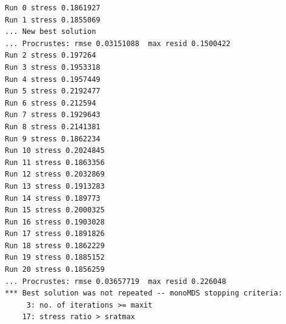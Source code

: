 \documentclass[
  letterpaper,
  DIV=11,
  numbers=noendperiod]{scrartcl}
\newenvironment{Shaded}{\begin{snugshade}}{\end{snugshade}}
\newcommand{\AttributeTok}[1]{\textcolor[rgb]{0.40,0.45,0.13}{#1}}
\newcommand{\ConstantTok}[1]{\textcolor[rgb]{0.56,0.35,0.01}{#1}}
\newcommand{\FunctionTok}[1]{\textcolor[rgb]{0.28,0.35,0.67}{#1}}
\newcommand{\NormalTok}[1]{\textcolor[rgb]{0.00,0.23,0.31}{#1}}
\newcommand{\OtherTok}[1]{\textcolor[rgb]{0.00,0.23,0.31}{#1}}
\newcommand{\SpecialCharTok}[1]{\textcolor[rgb]{0.37,0.37,0.37}{#1}}
\newcommand{\StringTok}[1]{\textcolor[rgb]{0.13,0.47,0.30}{#1}}
\begin{document}
\begin{Shaded}
\end{Shaded}

\begin{verbatim}
Run 0 stress 0.1861927 
Run 1 stress 0.1855069 
... New best solution
... Procrustes: rmse 0.03151088  max resid 0.1500422 
Run 2 stress 0.197264 
Run 3 stress 0.1953318 
Run 4 stress 0.1957449 
Run 5 stress 0.2192477 
Run 6 stress 0.212594 
Run 7 stress 0.1929643 
Run 8 stress 0.2141381 
Run 9 stress 0.1862234 
Run 10 stress 0.2024845 
Run 11 stress 0.1863356 
Run 12 stress 0.2032869 
Run 13 stress 0.1913283 
Run 14 stress 0.189773 
Run 15 stress 0.2000325 
Run 16 stress 0.1903028 
Run 17 stress 0.1891826 
Run 18 stress 0.1862229 
Run 19 stress 0.1885152 
Run 20 stress 0.1856259 
... Procrustes: rmse 0.03657719  max resid 0.226048 
*** Best solution was not repeated -- monoMDS stopping criteria:
     3: no. of iterations >= maxit
    17: stress ratio > sratmax
\end{verbatim}
\end{document}

